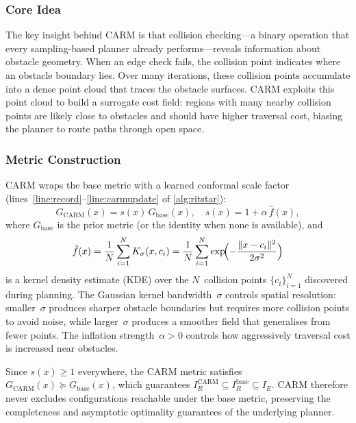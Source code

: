 \documentclass[journal]{IEEEtran}
\newcommand{\IR}{I_{\!R}}
\newcommand{\IE}{I_{\!E}}
\begin{document}
\subsubsection{Core Idea}

The key insight behind CARM is that collision checking---a binary
operation that every sampling-based planner already performs---reveals
information about obstacle geometry.
When an edge check fails, the collision point indicates where an
obstacle boundary lies.
Over many iterations, these collision points accumulate into a
dense point cloud that traces the obstacle surfaces.
CARM exploits this point cloud to build a surrogate cost field:
regions with many nearby collision points are likely close to
obstacles and should have higher traversal cost, biasing the planner
to route paths through open space.

\subsubsection{Metric Construction}

CARM wraps the base metric with a learned conformal scale factor
(lines~\ref{line:record}--\ref{line:carmupdate} of
\cref{alg:ritstar}):
\begin{equation}\label{eq:carm}
  G_{\mathrm{CARM}}(x) = s(x)\, G_{\mathrm{base}}(x), \quad
  s(x) = 1 + \alpha\, \hat{f}(x),
\end{equation}
where $G_{\mathrm{base}}$ is the prior metric (or the identity when
none is available), and
\begin{equation}\label{eq:kde}
  \hat{f}(x) = \frac{1}{N}\sum_{i=1}^{N}
  K_\sigma(x, c_i)
  = \frac{1}{N}\sum_{i=1}^{N}
  \exp\!\Bigl(-\frac{\|x - c_i\|^2}{2\sigma^2}\Bigr)
\end{equation}
is a kernel density estimate (KDE) over the $N$~collision points
$\{c_i\}_{i=1}^N$ discovered during planning.
The Gaussian kernel bandwidth~$\sigma$ controls spatial resolution:
smaller~$\sigma$ produces sharper obstacle boundaries but requires
more collision points to avoid noise, while larger~$\sigma$
produces a smoother field that generalises from fewer points.
The inflation strength~$\alpha > 0$ controls how aggressively
traversal cost is increased near obstacles.

Since $s(x) \ge 1$ everywhere, the CARM metric satisfies
$G_{\mathrm{CARM}}(x) \succeq G_{\mathrm{base}}(x)$, which
guarantees
$\IR^{\mathrm{CARM}} \subseteq \IR^{\mathrm{base}} \subseteq \IE$.
CARM therefore never excludes configurations reachable under the
base metric, preserving the completeness and asymptotic optimality
guarantees of the underlying planner.
\end{document}
